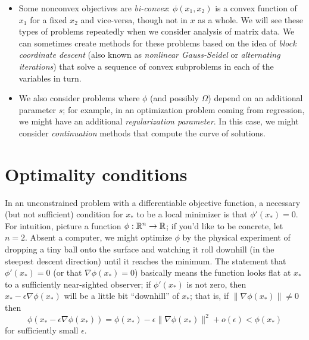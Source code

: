\documentclass[12pt, leqno]{article} %
\begin{document}
\begin{itemize}
\item
  Some nonconvex objectives are {\em bi-convex}:
  $\phi(x_1, x_2)$ is a convex function of $x_1$ for a fixed
  $x_2$ and vice-versa, though not in $x$ as a whole.
  We will see these types of problems repeatedly
  when we consider analysis of matrix data.  We can sometimes create
  methods for these problems based on the idea of
  {\em block coordinate descent} (also known as {\em nonlinear Gauss-Seidel}
  or {\em alternating iterations}) that solve a sequence of convex
  subproblems in each of the variables in turn.

\item
  We also consider problems where
  $\phi$ (and possibly $\Omega$) depend on an additional parameter
  $s$; for example, in an optimization problem coming from regression,
  we might have an additional {\em regularization parameter}.  In this
  case, we might consider {\em continuation} methods that 
  compute the curve of solutions.
  
\end{itemize}

\section{Optimality conditions}

In an unconstrained problem with a differentiable objective
function, a necessary (but not sufficient) condition for $x_*$
to be a local minimizer is that $\phi'(x_*) = 0$.
For intuition, picture a function $\phi : \mathbb{R}^n \rightarrow \mathbb{R}$; if
you'd like to be concrete, let $n = 2$.  Absent a computer, we might
optimize $\phi$ by the physical experiment of dropping a tiny ball
onto the surface and watching it roll downhill (in the steepest
descent direction) until it reaches the minimum.  The statement
that $\phi'(x_*) = 0$ (or that $\nabla \phi(x_*) = 0$) basically means
the function looks flat at $x_*$ to a sufficiently near-sighted observer;
if $\phi'(x_*)$ is not zero, then $x_* - \epsilon \nabla \phi(x_*)$
will be a little bit ``downhill'' of $x_*$; that is,
if $\|\nabla \phi(x_*)\| \neq 0$ then
\[
  \phi(x_* - \epsilon \nabla \phi(x_*)) =
  \phi(x_*) - \epsilon \|\nabla \phi(x_*)\|^2 + o(\epsilon) < \phi(x_*)
\]
for sufficiently small $\epsilon$.
\end{document}
